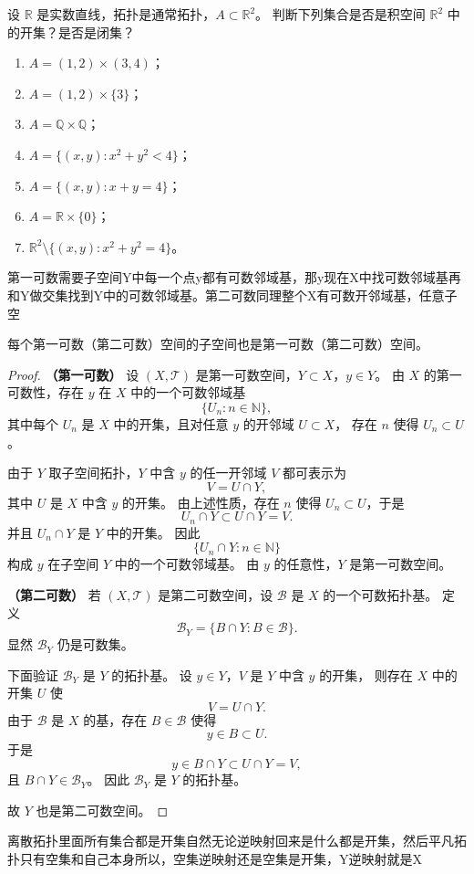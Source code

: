 \begin{homework}[13]
设 $\mathbb{R}$ 是实数直线，拓扑是通常拓扑，$A\subset \mathbb{R}^2$。  
判断下列集合是否是积空间 $\mathbb{R}^2$ 中的开集？是否是闭集？
\begin{enumerate}[(1)]
  \item $A = (1,2)\times(3,4)$；
  \item $A = (1,2)\times\{3\}$；
  \item $A = \mathbb{Q}\times\mathbb{Q}$；
  \item $A = \{(x,y): x^2+y^2<4\}$；
  \item $A = \{(x,y): x+y=4\}$；
  \item $A = \mathbb{R}\times\{0\}$；
  \item $\mathbb{R}^2\setminus\{(x,y):x^2+y^2=4\}$。
\end{enumerate}
\end{homework}
\begin{dxtips}
    第一可数需要子空间Y中每一个点y都有可数邻域基，那y现在X中找可数邻域基再和Y做交集找到Y中的可数邻域基。第二可数同理整个X有可数开邻域基，任意子空
\end{dxtips}
\begin{homework}[2.2]
每个第一可数（第二可数）空间的子空间也是第一可数（第二可数）空间。
\end{homework}
\begin{proof}
\textbf{（第一可数）}
设 $(X,\mathcal T)$ 是第一可数空间，$Y\subset X$，$y\in Y$。
由 $X$ 的第一可数性，存在 $y$ 在 $X$ 中的一个可数邻域基
\[
\{U_n:n\in\mathbb N\},
\]
其中每个 $U_n$ 是 $X$ 中的开集，且对任意 $y$ 的开邻域 $U\subset X$，
存在 $n$ 使得 $U_n\subset U$。

由于 $Y$ 取子空间拓扑，$Y$ 中含 $y$ 的任一开邻域 $V$
都可表示为
\[
V=U\cap Y,
\]
其中 $U$ 是 $X$ 中含 $y$ 的开集。
由上述性质，存在 $n$ 使得 $U_n\subset U$，于是
\[
U_n\cap Y\subset U\cap Y=V.
\]
并且 $U_n\cap Y$ 是 $Y$ 中的开集。
因此
\[
\{U_n\cap Y:n\in\mathbb N\}
\]
构成 $y$ 在子空间 $Y$ 中的一个可数邻域基。
由 $y$ 的任意性，$Y$ 是第一可数空间。

\medskip
\textbf{（第二可数）}
若 $(X,\mathcal T)$ 是第二可数空间，设 $\mathcal B$ 是 $X$ 的一个可数拓扑基。
定义
\[
\mathcal B_Y=\{B\cap Y: B\in\mathcal B\}.
\]
显然 $\mathcal B_Y$ 仍是可数集。

下面验证 $\mathcal B_Y$ 是 $Y$ 的拓扑基。
设 $y\in Y$，$V$ 是 $Y$ 中含 $y$ 的开集，
则存在 $X$ 中的开集 $U$ 使
\[
V=U\cap Y.
\]
由于 $\mathcal B$ 是 $X$ 的基，存在 $B\in\mathcal B$ 使得
\[
y\in B\subset U.
\]
于是
\[
y\in B\cap Y\subset U\cap Y=V,
\]
且 $B\cap Y\in\mathcal B_Y$。
因此 $\mathcal B_Y$ 是 $Y$ 的拓扑基。

故 $Y$ 也是第二可数空间。
\end{proof}
\begin{dxtips}
离散拓扑里面所有集合都是开集自然无论逆映射回来是什么都是开集，然后平凡拓扑只有空集和自己本身所以，空集逆映射还是空集是开集，Y逆映射就是X
\end{dxtips}

